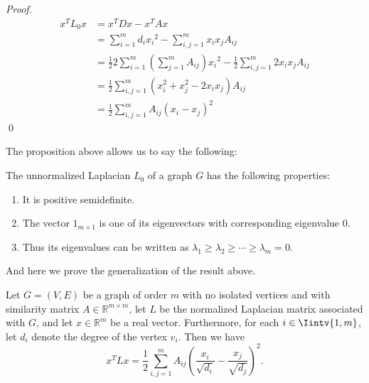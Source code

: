 \begin{proof}
   \begin{equation*} 
      \begin{split}
         x^TL_0x &= x^TDx - x^TAx \\
         &= \sum_{i=1}^m d_i{x_i}^2 - \sum_{i,j = 1}^m x_i  x_j A_{ij}  \\
         &= \frac{1}{2} 2 \sum_{i=1}^m \left( \sum_{j=1}^mA_{ij} \right){x_i}^2 - \frac{1}{2}\sum_{i,j = 1}^m 2x_i  x_j A_{ij}  \\
         &= \frac{1}{2} \sum_{i,j=1}^m (x_i^2 +x_j^2 - 2x_ix_j)A_{ij} \\
         &= \frac{1}{2} \sum_{i,j=1}^m A_{ij} \left( x_i - x_j \right) ^2
      \end{split}
   \end{equation*} \qed
\end{proof}

The proposition above allows us to say the following:

\begin{corollary}\label{unnormalizedLaplacianProperties}
   The unnormalized Laplacian $L_0$ of a graph $G$ has the following properties:
   \begin{enumerate}
      \item It is positive semidefinite.
      \item The vector $1_{m \times 1}$ is one of its eigenvectors with corresponding eigenvalue $0$.
      \item Thus its eigenvalues can be written as $\lambda_1 \ge \lambda_2 \ge \cdots \ge \lambda_m = 0$.
   \end{enumerate}
\end{corollary}

And here we prove the generalization of the result above.

\begin{proposition}\label{xtlx2}
   Let $G = (V,E)$ be a graph of order $m$ with no isolated vertices and with similarity matrix $A \in \mathbb R^{m \times m}$, let $L$ be the normalized Laplacian matrix associated with $G$, and let $x \in \mathbb R^{m} $ be a real vector. Furthermore, for each $i \in \Iintv{1,m}$, let $d_i$ denote the degree of the vertex $v_i$. Then we have
   \begin{equation}
      x^TLx = \frac{1}{2}\sum_{i,j = 1}^m A_{ij} \left( \frac{x_i}{\sqrt{d_i}} - \frac{x_j}{\sqrt{d_j}} \right)^2.
   \end{equation}
\end{proposition}

